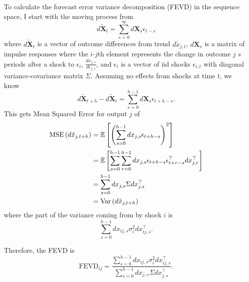 To calculate the forecast error variance decomposition (FEVD) in the sequence space, I start with the moving process from \textcite{auclert2021using}
\[
    d \mathbf{\tilde{X}}_t = \sum_{s = 0}^\infty d \mathbf{X}_s \epsilon_{t-s}
\]
where $d \mathbf{\tilde{X}}_t$ is a vector of outcome differences from trend $d \tilde{x}_{j, t}$, $d \mathbf{X}_s$ is a matrix of impulse responses where the $i$-$j$th element represents the change in outcome $j$ $s$ periods after a shock to $\epsilon_i$, $\frac{d x_{j, s}}{d \epsilon_{j, s}}$, and $\epsilon_{t}$ is a vector of iid shocks $\epsilon_{i, t}$ with diagonal variance-covariance matrix $\Sigma$. Assuming no effects from shocks at time $t$, we know
\[
    d \mathbf{\tilde{X}}_{t+h} - d \mathbf{\tilde{X}}_t = \sum_{s = 0}^{h - 1} d \mathbf{X}_s \epsilon_{t+h-s}.
\]
This gets Mean Squared Error for output $j$ of
\begin{align*}
    \text{MSE} \left(d \tilde{x}_{j, t+h}\right) &= \mathbb{E} \left[\left(\sum_{s = 0}^{h - 1} d x_{j, s} \epsilon_{t+h-s}\right)^2 \right] \\
    &= \mathbb{E} \left[\sum_{s = 0}^{h - 1} \sum_{r = 0}^{h - 1} d x_{j, s} \epsilon_{t+h-s} \epsilon_{t+r-s}^\top d x_{j, r}^\top\right] \\
    &= \sum_{s = 0}^{h - 1} d x_{j, s} \Sigma d x_{j, s}^\top \\
    &= \text{Var} \left(d \tilde{x}_{j, t+h}\right)
\end{align*}
where the part of the variance coming from by shock $i$ is
\[
    \sum_{s = 0}^{h - 1} d x_{ij, s} \sigma_i^2 d x_{ij, s}^\top.
\]

Therefore, the FEVD is
\[
    \text{FEVD}_{ij} = \frac{\sum_{s = 0}^{h - 1} d x_{ij, s} \sigma_i^2 d x_{ij, s}^\top}{\sum_{s = 0}^{h - 1} d x_{j, s} \Sigma d x_{j, s}^\top}.
\]
